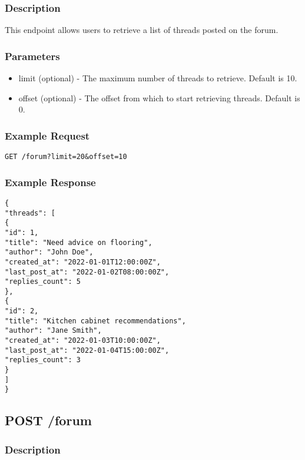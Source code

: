 \documentclass{article}
\begin{document}
\subsubsection{Description}

This endpoint allows users to retrieve a list of threads posted on the forum.

\subsubsection{Parameters}

\begin{itemize}
\item limit (optional) - The maximum number of threads to retrieve. Default is 10.
\item offset (optional) - The offset from which to start retrieving threads. Default is 0.
\end{itemize}

\subsubsection{Example Request}

\begin{verbatim}
GET /forum?limit=20&offset=10
\end{verbatim}

\subsubsection{Example Response}

\begin{verbatim}
{
"threads": [
{
"id": 1,
"title": "Need advice on flooring",
"author": "John Doe",
"created_at": "2022-01-01T12:00:00Z",
"last_post_at": "2022-01-02T08:00:00Z",
"replies_count": 5
},
{
"id": 2,
"title": "Kitchen cabinet recommendations",
"author": "Jane Smith",
"created_at": "2022-01-03T10:00:00Z",
"last_post_at": "2022-01-04T15:00:00Z",
"replies_count": 3
}
]
}
\end{verbatim}

\subsection{POST /forum}

\subsubsection{Description}
\end{document}
